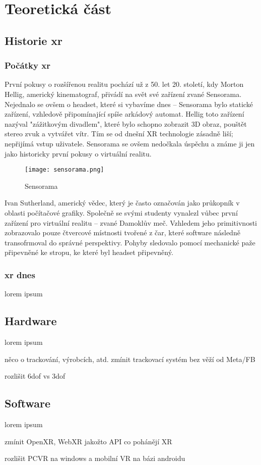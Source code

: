 \part{Teoretická část}

\chapter{Historie \gls{xr}}

\section{Počátky \gls{xr}}

První pokusy o rozšířenou realitu pochází už z 50. let 20. století, kdy Morton Hellig, americký kinematograf, přivádí na svět své zařízení zvané Sensorama. Nejednalo se ovšem o headset, které si vybavíme dnes -- Sensorama bylo statické zařízení, vzhledově připomínající spíše arkádový automat. Hellig toto zařízení nazýval "zážitkovým divadlem", které bylo schopno zobrazit 3D obraz, pouštět stereo zvuk a vytvářet vítr. Tím se od dnešní XR technologie zásadně liší; nepřijímá vstup uživatele. Sensorama se ovšem nedočkala úspěchu a známe ji jen jako historicky první pokusy o virtuální realitu.

\begin{figure}[H]
    \centering
    \texttt{[image: sensorama.png]}
    \caption{Sensorama}
    \label{sensorama}
\end{figure}

Ivan Sutherland, americký vědec, který je často označován jako průkopník v oblasti počítačové grafiky. Společně se svými studenty vynalezl vůbec první zařízení pro virtuální realitu -- zvané Damoklův meč. Vzhledem jeho primitivnosti zobrazovalo pouze čtvercové místnosti tvořené z čar, které software následně transofrmoval do správné perspektivy. Pohyby sledovalo pomocí mechanické paže připevněné ke stropu, ke které byl headset připevněný.

\section{\gls{xr} dnes}

lorem ipsum

\chapter{Hardware}
lorem ipsum

něco o trackování, výrobcích, atd. zmínit trackovací systém bez věží od Meta/FB

rozlišit 6dof vs 3dof

\chapter{Software}
lorem ipsum

zmínit OpenXR, WebXR jakožto API co pohánějí XR

rozlišit PCVR na windows a mobilní VR na bázi androidu